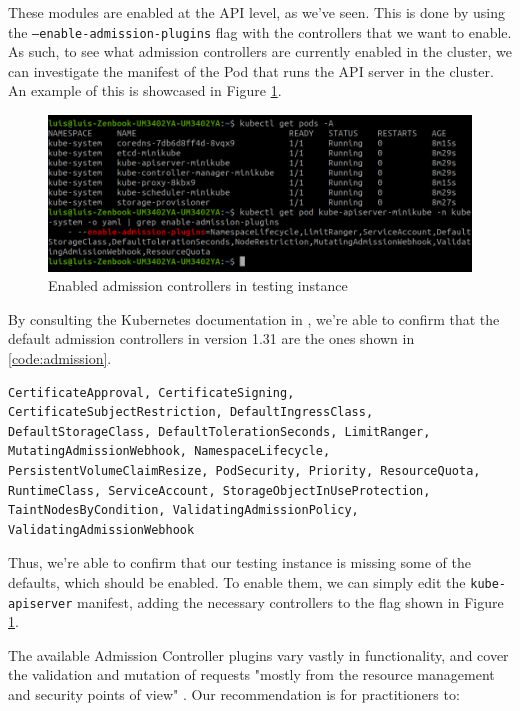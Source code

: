 \documentclass[a4paper,11pt,openright,BCOR=15mm]{scrbook}
\begin{document}
These modules are enabled at the API level, as we've seen. This is done by using the \texttt{--enable-admission-plugins} flag with the controllers that we want to enable. As such, to see what admission controllers are currently enabled in the cluster, we can investigate the manifest of the Pod that runs the API server in the cluster. An example of this is showcased in Figure \ref{fig:admission}.

\begin{figure}[h!]
	\centering
	\label{fig:admission}
	\includegraphics[scale=0.5]{figs/enabled-admission.png}
	\caption{Enabled admission controllers in testing instance}
\end{figure}

By consulting the Kubernetes documentation in \cite{the_linux_foundation_admission_2024}, we're able to confirm that the default admission controllers in version 1.31 are the ones shown in \ref{code:admission}.

\begin{lstlisting}[style=yaml,caption={Default Admission Controllers},label=code:admission]
	CertificateApproval, CertificateSigning, CertificateSubjectRestriction, DefaultIngressClass, DefaultStorageClass, DefaultTolerationSeconds, LimitRanger, MutatingAdmissionWebhook, NamespaceLifecycle, PersistentVolumeClaimResize, PodSecurity, Priority, ResourceQuota, RuntimeClass, ServiceAccount, StorageObjectInUseProtection, TaintNodesByCondition, ValidatingAdmissionPolicy, ValidatingAdmissionWebhook
\end{lstlisting}

Thus, we're able to confirm that our testing instance is missing some of the defaults, which should be enabled. To enable them, we can simply edit the \texttt{kube-apiserver} manifest, adding the necessary controllers to the flag shown in Figure \ref{fig:admission}.

The available Admission Controller plugins vary vastly in functionality, and cover the validation and mutation of requests "mostly from the resource management and security points of view" \cite{sayfan_mastering_2020}. Our recommendation is for practitioners to:
\end{document}

